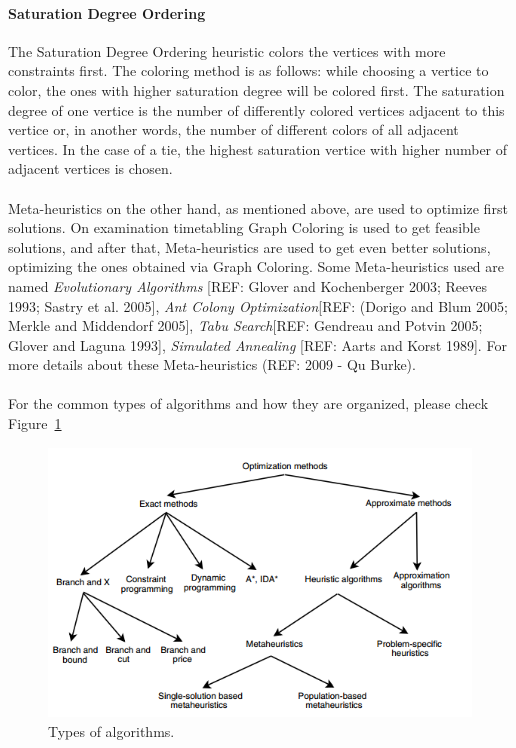 \paragraph{Saturation Degree Ordering}
The Saturation Degree Ordering heuristic colors the vertices with more constraints first. The coloring method is as follows: while choosing a vertice to color, the ones with higher saturation degree will be colored first. The saturation degree of one vertice is the number of differently colored vertices adjacent to this vertice or, in another words, the number of different colors of all adjacent vertices. In the case of a tie, the highest saturation vertice with higher number of adjacent vertices is chosen.\\
\\
Meta-heuristics on the other hand, as mentioned above, are used to optimize first solutions. On examination timetabling Graph Coloring is used to get feasible solutions, and after that, Meta-heuristics are used to get even better solutions, optimizing the ones obtained via Graph Coloring. Some Meta-heuristics used are named \textit{Evolutionary Algorithms} [REF: Glover and Kochenberger 2003; Reeves 1993; Sastry et al. 2005], \textit{Ant Colony Optimization}[REF: (Dorigo and Blum 2005; Merkle and Middendorf 2005], \textit{Tabu Search}[REF: Gendreau and Potvin 2005; Glover and Laguna 1993], \textit{Simulated Annealing} [REF: Aarts and Korst 1989]. For more details about these Meta-heuristics (REF: 2009 - Qu Burke).\\
\\

For the common types of algorithms and how they are organized, please check Figure~\ref{fig:TypesAlgorithms}

\begin{figure}[h!]
 \centering
   \includegraphics{./images/types_of_algorithms.png}
   \caption{Types of algorithms.}
   \label{fig:TypesAlgorithms}
\end{figure}


